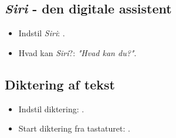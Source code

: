 \documentclass[a4paper, landscape, 10pt]{scrartcl}
\begin{document}
\begin{multicols}{2}
\subsection*{\emph{Siri} - den digitale assistent}
\begin{itemize}
  \item {Indstil \emph{Siri}: .}
  \item {Hvad kan \emph{Siri}?: \textit{"Hvad kan du?"}.}
\end{itemize}

\subsection*{Diktering af tekst}
\begin{itemize}
  \item {Indstil diktering: .}
  \item {Start diktering fra tastaturet: \faMicrophone.}
\end{itemize}

\end{multicols}
\hrulefill{}
\end{document}
